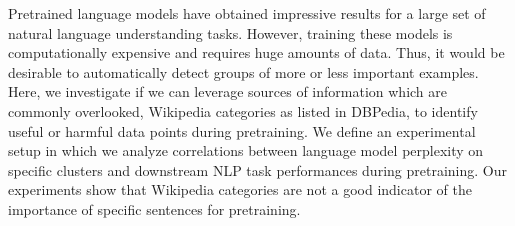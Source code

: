 Pretrained language models have obtained impressive results for a large set of natural language understanding tasks. However, training these models is computationally expensive and requires huge amounts of data. Thus, it would be desirable to automatically detect groups of more or less important examples. Here, we investigate if we can leverage sources of information which are commonly overlooked, Wikipedia categories as listed in DBPedia, to identify useful or harmful data points during pretraining. We define an experimental setup in which we analyze correlations between language model perplexity on specific clusters and downstream NLP task performances during pretraining. Our experiments show that Wikipedia categories are not a good indicator of the importance of specific sentences for pretraining.
